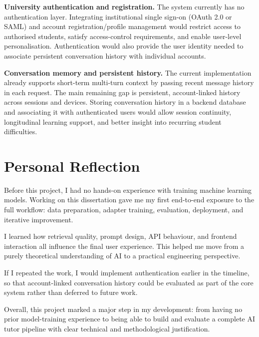 \textbf{University authentication and registration.} The system currently has no authentication layer. Integrating institutional single sign-on (OAuth 2.0 or SAML) and account registration/profile management would restrict access to authorised students, satisfy access-control requirements, and enable user-level personalisation. Authentication would also provide the user identity needed to associate persistent conversation history with individual accounts.

\textbf{Conversation memory and persistent history.} The current implementation already supports short-term multi-turn context by passing recent message history in each request. The main remaining gap is persistent, account-linked history across sessions and devices. Storing conversation history in a backend database and associating it with authenticated users would allow session continuity, longitudinal learning support, and better insight into recurring student difficulties.



\section{Personal Reflection}

Before this project, I had no hands-on experience with training machine learning models. 
Working on this dissertation gave me my first end-to-end exposure to the full workflow: data preparation, adapter training, evaluation, deployment, and iterative improvement.

I learned how retrieval quality, prompt design, API behaviour, and frontend interaction all influence the final user experience. 
This helped me move from a purely theoretical understanding of AI to a practical engineering perspective.

If I repeated the work, I would implement authentication earlier in the timeline, so that account-linked conversation history could be evaluated as part of the core system rather than deferred to future work.

Overall, this project marked a major step in my development: from having no prior model-training experience to being able to build and evaluate a complete AI tutor pipeline with clear technical and methodological justification.